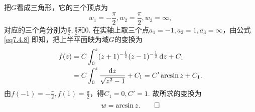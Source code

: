 \begin{solution}
  把$G$看成三角形，它的三个顶点为
  \[
    w_1 = -\frac\pi2, w_2 = \frac\pi2, w_3 = \infty,
  \]
  对应的三个角分别为$\frac\pi2,\frac\pi2$和$0$. 在实轴上取三个点$a_1=-1,a_2=1,a_3=\infty$，由公式 \eqref{eq7.4.8} 即知，把上半平面映为域$G$的变换为
  \begin{align*}
    f(z) & = C\int_0^z(z+1)^{-\frac12}(z-1)^{-\frac12}\mathop{}\!\mathrm dz + C_1\\
    & = C\int_0^z\frac{\mathop{}\!\mathrm dz}{\sqrt{z^2-1}} + C_1 = C'\arcsin z + C_1.
  \end{align*}
  由$f(-1)=-\frac\pi2,f(1)=\frac\pi2$，得$C_1=0,C'=1$. 故所求的变换为
  \begin{equation*}
    w = \arcsin z. \qedhere
  \end{equation*}
\end{solution}



